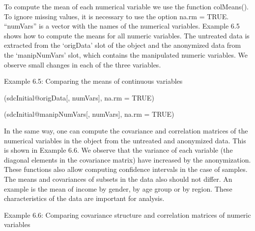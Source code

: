 \documentclass[letterpaper,10pt,english]{sphinxmanual}
\begin{document}
To compute the mean of each numerical variable we use the function
colMeans(). To ignore missing values, it is necessary to use the option
na.rm = TRUE. “numVars” is a vector with the names of the numerical
variables. Example 6.5 shows how to compute the means for all numeric
variables. The untreated data is extracted from the ‘origData’ slot of
the  object and the anonymized data from the ‘manipNumVars’
slot, which contains the manipulated numeric variables. We observe small
changes in each of the three variables.

Example 6.5: Comparing the means of continuous variables


(sdcInitial@origData{[}, numVars{]}, na.rm = TRUE)

\begin{DUlineblock}{0em}
\item[] 
\item[] 
\end{DUlineblock}


(sdcInitial@manipNumVars{[}, numVars{]}, na.rm = TRUE)

\begin{DUlineblock}{0em}
\item[] 
\item[] 
\end{DUlineblock}

In the same way, one can compute the covariance and correlation matrices
of the numerical variables in the  object from the untreated
and anonymized data. This is shown in Example 6.6. We observe that the
variance of each variable (the diagonal elements in the covariance
matrix) have increased by the anonymization. These functions also allow
computing confidence intervals in the case of samples. The means and
covariances of subsets in the data also should not differ. An example is
the mean of income by gender, by age group or by region. These
characteristics of the data are important for analysis.

Example 6.6: Comparing covariance structure and correlation matrices of
numeric variables
\end{document}
